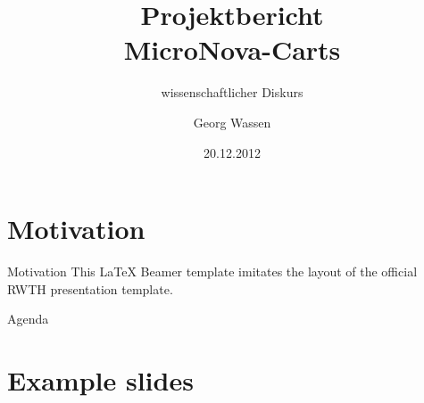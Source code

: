 \documentclass[]{beamer}
\title[NovaCarts-Projekt]{Projektbericht\\MicroNova-Carts}
\subtitle{wissenschaftlicher Diskurs}
\author{Georg Wassen}
\institute{Lehrstuhl für Betriebssysteme}
\date{20.12.2012}
\begin{document}

\section*{Motivation}



\begin{frame}{Motivation}
  This \LaTeX{} Beamer template imitates the layout of the official RWTH presentation template.
\end{frame}

\begin{frame}{Agenda}
  \tableofcontents
\end{frame}

\section{Example slides}
\end{document}
